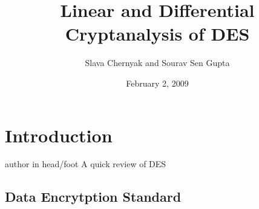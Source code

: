 \documentclass[9pt]{beamer}
\title{Linear and Differential Cryptanalysis of DES}
\author{Slava Chernyak and Sourav Sen Gupta}
\institute{University of Washington}
\date{February 2, 2009}
\begin{document}
\begin{frame}
\titlepage
\end{frame}

\section{Introduction}

\begin{frame}
\begin{beamercolorbox}[ht=2.5ex,dp=1.125ex,center,rounded=true,shadow=true]{author in head/foot}
A quick review of DES
\end{beamercolorbox}
\end{frame}

\subsection{Data Encrytption Standard}
\end{document}
